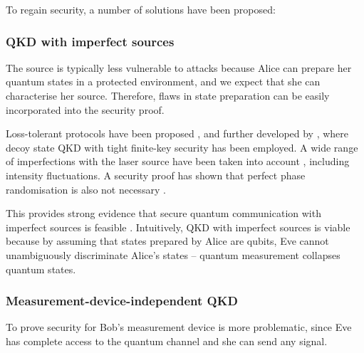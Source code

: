 To regain security, a number of solutions have been proposed:

\subsubsection{QKD with imperfect sources}

The source is typically less vulnerable to attacks because Alice can prepare her quantum states in a protected environment, and we expect that she can characterise her source. Therefore, flaws in state preparation can be easily incorporated into the security proof.

Loss-tolerant protocols have been proposed \cite{bib:PhysRevA.90.052314}, and further developed by \cite{bib:PhysRevA.92.032305}, where decoy state QKD with tight finite-key security has been employed. A wide range of imperfections with the laser source have been taken into account \cite{bib:mizutani2015finite}, including intensity fluctuations. A security proof has shown that perfect phase randomisation is also not necessary \cite{bib:cao2015discrete}.

This provides strong evidence that secure quantum communication with imperfect sources is feasible \cite{bib:diamanti2016practical}. Intuitively, QKD with imperfect sources is viable because by assuming that states prepared by Alice are qubits, Eve cannot unambiguously discriminate Alice's states \cite{bib:diamanti2016practical} -- quantum measurement collapses quantum states. 

\subsubsection{Measurement-device-independent QKD}

To prove security for Bob's measurement device is more problematic, since Eve has complete access to the quantum channel and she can send any signal. 


